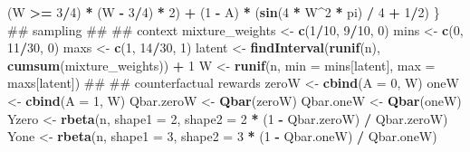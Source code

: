 \documentclass[]{article}
\newenvironment{Shaded}{\begin{snugshade}}{\end{snugshade}}
\newcommand{\DataTypeTok}[1]{\textcolor[rgb]{0.13,0.29,0.53}{#1}}
\newcommand{\DecValTok}[1]{\textcolor[rgb]{0.00,0.00,0.81}{#1}}
\newcommand{\KeywordTok}[1]{\textcolor[rgb]{0.13,0.29,0.53}{\textbf{#1}}}
\newcommand{\NormalTok}[1]{#1}
\newcommand{\OperatorTok}[1]{\textcolor[rgb]{0.81,0.36,0.00}{\textbf{#1}}}
\newcommand{\StringTok}[1]{\textcolor[rgb]{0.31,0.60,0.02}{#1}}
\theoremstyle{definition}
\theoremstyle{definition}
\theoremstyle{definition}
\theoremstyle{remark}
\begin{document}
\begin{Shaded}
\begin{Highlighting}[]
\StringTok{         }\NormalTok{(W }\OperatorTok{>=}\StringTok{ }\DecValTok{3}\OperatorTok{/}\DecValTok{4}\NormalTok{) }\OperatorTok{*}\StringTok{ }\NormalTok{(W }\OperatorTok{-}\StringTok{ }\DecValTok{3}\OperatorTok{/}\DecValTok{4}\NormalTok{) }\OperatorTok{*}\StringTok{ }\DecValTok{2}\NormalTok{) }\OperatorTok{+}
\StringTok{      }\NormalTok{(}\DecValTok{1} \OperatorTok{-}\StringTok{ }\NormalTok{A) }\OperatorTok{*}\StringTok{ }\NormalTok{(}\KeywordTok{sin}\NormalTok{(}\DecValTok{4} \OperatorTok{*}\StringTok{ }\NormalTok{W}\OperatorTok{^}\DecValTok{2} \OperatorTok{*}\StringTok{ }\NormalTok{pi) }\OperatorTok{/}\StringTok{ }\DecValTok{4} \OperatorTok{+}\StringTok{ }\DecValTok{1}\OperatorTok{/}\DecValTok{2}\NormalTok{) }
\NormalTok{  \}}
\NormalTok{  ## sampling}
\NormalTok{  ## ## context}
\NormalTok{  mixture_weights <-}\StringTok{ }\KeywordTok{c}\NormalTok{(}\DecValTok{1}\OperatorTok{/}\DecValTok{10}\NormalTok{, }\DecValTok{9}\OperatorTok{/}\DecValTok{10}\NormalTok{, }\DecValTok{0}\NormalTok{)}
\NormalTok{  mins <-}\StringTok{ }\KeywordTok{c}\NormalTok{(}\DecValTok{0}\NormalTok{, }\DecValTok{11}\OperatorTok{/}\DecValTok{30}\NormalTok{, }\DecValTok{0}\NormalTok{)}
\NormalTok{  maxs <-}\StringTok{ }\KeywordTok{c}\NormalTok{(}\DecValTok{1}\NormalTok{, }\DecValTok{14}\OperatorTok{/}\DecValTok{30}\NormalTok{, }\DecValTok{1}\NormalTok{)}
\NormalTok{  latent <-}\StringTok{ }\KeywordTok{findInterval}\NormalTok{(}\KeywordTok{runif}\NormalTok{(n), }\KeywordTok{cumsum}\NormalTok{(mixture_weights)) }\OperatorTok{+}\StringTok{ }\DecValTok{1}
\NormalTok{  W <-}\StringTok{ }\KeywordTok{runif}\NormalTok{(n, }\DataTypeTok{min =}\NormalTok{ mins[latent], }\DataTypeTok{max =}\NormalTok{ maxs[latent])}
\NormalTok{  ## ## counterfactual rewards}
\NormalTok{  zeroW <-}\StringTok{ }\KeywordTok{cbind}\NormalTok{(}\DataTypeTok{A =} \DecValTok{0}\NormalTok{, W)}
\NormalTok{  oneW <-}\StringTok{ }\KeywordTok{cbind}\NormalTok{(}\DataTypeTok{A =} \DecValTok{1}\NormalTok{, W)}
\NormalTok{  Qbar.zeroW <-}\StringTok{ }\KeywordTok{Qbar}\NormalTok{(zeroW)}
\NormalTok{  Qbar.oneW <-}\StringTok{ }\KeywordTok{Qbar}\NormalTok{(oneW)}
\NormalTok{  Yzero <-}\StringTok{ }\KeywordTok{rbeta}\NormalTok{(n, }\DataTypeTok{shape1 =} \DecValTok{2}\NormalTok{, }\DataTypeTok{shape2 =} \DecValTok{2} \OperatorTok{*}\StringTok{ }\NormalTok{(}\DecValTok{1} \OperatorTok{-}\StringTok{ }\NormalTok{Qbar.zeroW) }\OperatorTok{/}\StringTok{ }\NormalTok{Qbar.zeroW)}
\NormalTok{  Yone <-}\StringTok{ }\KeywordTok{rbeta}\NormalTok{(n, }\DataTypeTok{shape1 =} \DecValTok{3}\NormalTok{, }\DataTypeTok{shape2 =} \DecValTok{3} \OperatorTok{*}\StringTok{ }\NormalTok{(}\DecValTok{1} \OperatorTok{-}\StringTok{ }\NormalTok{Qbar.oneW) }\OperatorTok{/}\StringTok{ }\NormalTok{Qbar.oneW)}

\end{Highlighting}
\end{Shaded}
\end{document}
